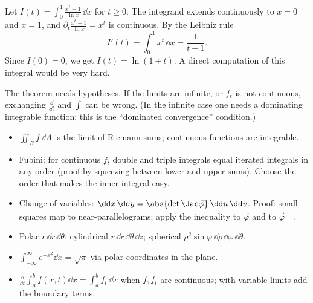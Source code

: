 \begin{example}
Let $I(t)=\displaystyle\int_0^1\frac{x^t-1}{\ln x}\,\dd x$ for $t\ge0$. The integrand extends continuously to $x=0$ and $x=1$, and $\partial_t\frac{x^t-1}{\ln x}=x^t$ is continuous. By the Leibniz rule
\[
I'(t)=\int_0^1x^t\,\dd x=\frac1{t+1}.
\]
Since $I(0)=0$, we get $I(t)=\ln(1+t)$. A direct computation of this integral would be very hard.
\end{example}

\begin{pitfall}
The theorem needs hypotheses. If the limits are infinite, or $f_t$ is not continuous, exchanging $\frac{\dd}{\dd t}$ and $\int$ can be wrong. (In the infinite case one needs a dominating integrable function: this is the ``dominated convergence'' condition.)
\end{pitfall}

\begin{summarybox}
\begin{itemize}
  \item $\iint_Rf\,\dd A$ is the limit of Riemann sums; continuous functions are integrable.
  \item Fubini: for continuous $f$, double and triple integrals equal iterated integrals in any order (proof by squeezing between lower and upper sums). Choose the order that makes the inner integral easy.
  \item Change of variables: $\dd x\,\dd y=\abs{\det\Jac\vec\varphi}\,\dd u\,\dd v$. Proof: small squares map to near-parallelograms; apply the inequality to $\vec\varphi$ and to $\vec\varphi^{-1}$.
  \item Polar $r\,\dd r\,\dd\theta$; cylindrical $r\,\dd r\,\dd\theta\,\dd z$; spherical $\rho^2\sin\varphi\,\dd\rho\,\dd\varphi\,\dd\theta$.
  \item $\int_{-\infty}^{\infty}e^{-x^2}\dd x=\sqrt\pi$ via polar coordinates in the plane.
  \item $\frac{\dd}{\dd t}\int_a^bf(x,t)\dd x=\int_a^b f_t\,\dd x$ when $f,f_t$ are continuous; with variable limits add the boundary terms.
\end{itemize}
\end{summarybox}

